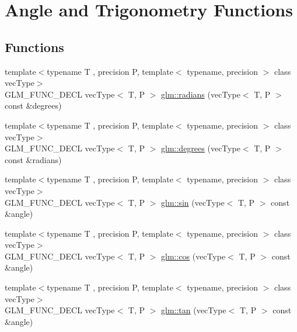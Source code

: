 \hypertarget{group__core__func__trigonometric}{\section{Angle and Trigonometry Functions}
\label{group__core__func__trigonometric}
}
\subsection*{Functions}
\begin{DoxyCompactItemize}
\item 
{\footnotesize template$<$typename T , precision P, template$<$ typename, precision $>$ class vec\-Type$>$ }\\G\-L\-M\-\_\-\-F\-U\-N\-C\-\_\-\-D\-E\-C\-L vec\-Type$<$ T, P $>$ \hyperlink{group__core__func__trigonometric_ga0fd3ad793538521f76fa30db7f6edfed}{glm\-::radians} (vec\-Type$<$ T, P $>$ const \&degrees)
\item 
{\footnotesize template$<$typename T , precision P, template$<$ typename, precision $>$ class vec\-Type$>$ }\\G\-L\-M\-\_\-\-F\-U\-N\-C\-\_\-\-D\-E\-C\-L vec\-Type$<$ T, P $>$ \hyperlink{group__core__func__trigonometric_ga402144a18234e642b702bf585599b46d}{glm\-::degrees} (vec\-Type$<$ T, P $>$ const \&radians)
\item 
{\footnotesize template$<$typename T , precision P, template$<$ typename, precision $>$ class vec\-Type$>$ }\\G\-L\-M\-\_\-\-F\-U\-N\-C\-\_\-\-D\-E\-C\-L vec\-Type$<$ T, P $>$ \hyperlink{group__core__func__trigonometric_ga4a0ddceb6b1e64ce0e4da209dcb021d5}{glm\-::sin} (vec\-Type$<$ T, P $>$ const \&angle)
\item 
{\footnotesize template$<$typename T , precision P, template$<$ typename, precision $>$ class vec\-Type$>$ }\\G\-L\-M\-\_\-\-F\-U\-N\-C\-\_\-\-D\-E\-C\-L vec\-Type$<$ T, P $>$ \hyperlink{group__core__func__trigonometric_ga728fd86f14609e37d83f82429995b7b3}{glm\-::cos} (vec\-Type$<$ T, P $>$ const \&angle)
\item 
{\footnotesize template$<$typename T , precision P, template$<$ typename, precision $>$ class vec\-Type$>$ }\\G\-L\-M\-\_\-\-F\-U\-N\-C\-\_\-\-D\-E\-C\-L vec\-Type$<$ T, P $>$ \hyperlink{group__core__func__trigonometric_gab3ae890c38b7d3aa4d5e00998fd296b2}{glm\-::tan} (vec\-Type$<$ T, P $>$ const \&angle)
\item 

\end{DoxyCompactItemize}
